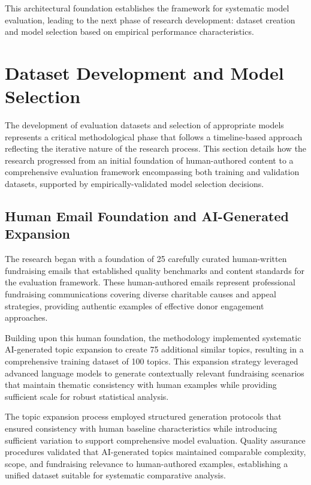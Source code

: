 This architectural foundation establishes the framework for systematic model evaluation, leading to the next phase of research development: dataset creation and model selection based on empirical performance characteristics.

\section{Dataset Development and Model Selection}
\label{sec:dataset-model-selection}

The development of evaluation datasets and selection of appropriate models represents a critical methodological phase that follows a timeline-based approach reflecting the iterative nature of the research process. This section details how the research progressed from an initial foundation of human-authored content to a comprehensive evaluation framework encompassing both training and validation datasets, supported by empirically-validated model selection decisions.

\subsection{Human Email Foundation and AI-Generated Expansion}

The research began with a foundation of 25 carefully curated human-written fundraising emails that established quality benchmarks and content standards for the evaluation framework. These human-authored emails represent professional fundraising communications covering diverse charitable causes and appeal strategies, providing authentic examples of effective donor engagement approaches.

Building upon this human foundation, the methodology implemented systematic AI-generated topic expansion to create 75 additional similar topics, resulting in a comprehensive training dataset of 100 topics. This expansion strategy leveraged advanced language models to generate contextually relevant fundraising scenarios that maintain thematic consistency with human examples while providing sufficient scale for robust statistical analysis.

The topic expansion process employed structured generation protocols that ensured consistency with human baseline characteristics while introducing sufficient variation to support comprehensive model evaluation. Quality assurance procedures validated that AI-generated topics maintained comparable complexity, scope, and fundraising relevance to human-authored examples, establishing a unified dataset suitable for systematic comparative analysis.

